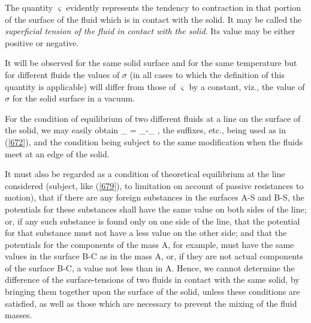 \documentclass[12pt]{article}
\begin{document}
The quantity $\varsigma$ evidently represents the tendency to contraction in that portion of the surface of the fluid which is in contact with the solid. It may be called the \textit{superficial tension of the fluid in contact with the solid}. Its value may be either positive or negative.

It will be observed for the same solid surface and for the same temperature but for different fluids the values of $\sigma$ (in all cases to which the definition of this quantity is applicable) will differ from those of $\varsigma$ by a constant, viz., the value of $\sigma$ for the solid surface in a vacuum.

For the condition of equilibrium of two different fluids at a line on the surface of the solid, we may easily obtain
\eqs \sigma_{} \cos \alpha = \varsigma_{}-\varsigma_{}  ,  \label{679}\eqe
the suffixes, etc., being used as in (\ref{672}), and the condition being subject to the same modification when the fluids meet at an edge of the solid.

It must also be regarded as a condition of theoretical equilibrium at the line considered (subject, like (\ref{679}), to limitation on account of passive resistances to motion), that if there are any foreign substances in the surfaces A-S and B-S, the potentials for these substances shall have the same value on both sides of the line; or, if any such substance is found only on one side of the line, that the potential for that substance must not have a less value on the other side; and that the potentials for the components of the mass A, for example, must have the same values in the surface B-C as in the mass A, or, if they are not actual components of the surface B-C, a value not less than in A. Hence, we cannot determine the difference of the surface-tensions of two fluids in contact with the same solid, by bringing them together upon the surface of the solid, unless these conditions are satisfied, as well as those which are necessary to prevent the mixing of the fluid masses.
\end{document}
